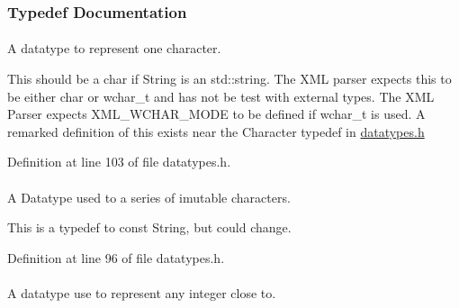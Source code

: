 \subsubsection{Typedef Documentation}
\hypertarget{namespacephys_a3098bae5b0a3cd16eec331f766cc562b}{
\paragraph[{Character}]{}\hfill}
\label{namespacephys_a3098bae5b0a3cd16eec331f766cc562b}


A datatype to represent one character. 

This should be a char if String is an std::string. The XML parser expects this to be either char or wchar\_\-t and has not be test with external types. The XML Parser expects XML\_\-WCHAR\_\-MODE to be defined if wchar\_\-t is used. A remarked definition of this exists near the Character typedef in \hyperlink{datatypes_8h_source}{datatypes.h} 

Definition at line 103 of file datatypes.h.

\hypertarget{namespacephys_a5ce5049f8b4bf88d6413c47b504ebb31}{
\paragraph[{ConstString}]{}\hfill}
\label{namespacephys_a5ce5049f8b4bf88d6413c47b504ebb31}


A Datatype used to a series of imutable characters. 

This is a typedef to const String, but could change. 

Definition at line 96 of file datatypes.h.

\hypertarget{namespacephys_a7f09bf5585b2bb97613cd9aad4273a81}{
\paragraph[{Integer}]{}\hfill}
\label{namespacephys_a7f09bf5585b2bb97613cd9aad4273a81}


A datatype use to represent any integer close to. 

